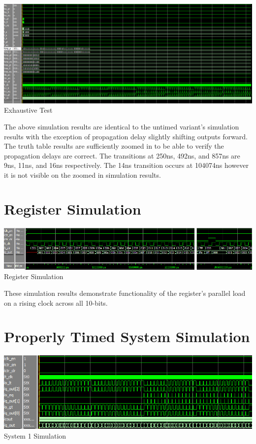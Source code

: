 \documentclass[12pt,letterpaper,titlepage]{article}
\begin{document}
\begin{raggedright}
\begin{center}
\includegraphics[width=\textwidth]{tb_exh}
Exhaustive Test
\end{center}

The above simulation results are identical to the untimed variant's simulation results with the exception of propagation delay slightly shifting outputs forward. The truth table results are sufficiently zoomed in to be able to verify the propagation delays are correct. The transitions at 250ns, 492ns, and 857ns are 9ns, 11ns, and 16ns respectively. The 14ns transition occurs at 104074ns however it is not visible on the zoomed in simulation results.
\clearpage

\section{Register Simulation}
\begin{center}
\includegraphics[width=\textwidth]{tb_reg}
Register Simulation
\end{center}

These simulation results demonstrate functionality of the register's parallel load on a rising clock across all 10-bits.

\section{Properly Timed System Simulation}
\begin{center}
\includegraphics[width=\textwidth]{tb_sys1}
System 1 Simulation
\end{center}


\end{raggedright}
\end{document}
